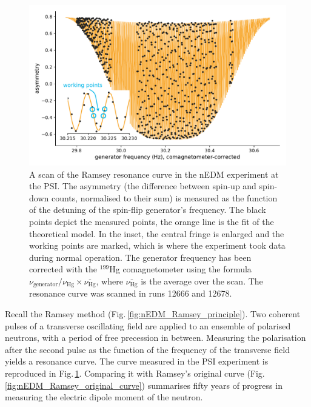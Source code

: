 \begin{figure}
  \centering
  \includegraphics[width=\linewidth]{gfx/nEDMatPSI/ramsey_scan.pdf}
  \caption{A scan of the Ramsey resonance curve in the nEDM experiment at the PSI\@. The asymmetry (the difference between spin-up and spin-down counts, normalised to their sum) is measured as the function of the detuning of the spin-flip generator's frequency. The black points depict the measured points, the orange line is the fit of the theoretical model. In the inset, the central fringe is enlarged and the working points are marked, which is where the experiment took data during normal operation. The generator frequency has been corrected with the $^{199}$Hg comagnetometer using the formula $\nu_\text{generator} / \nu_\text{Hg} \times \overline{\nu_\text{Hg}}$, where $\overline{\nu_\text{Hg}}$ is the average over the scan. The resonance curve was scanned in runs 12666 and 12678.}\label{fig:ramsey_scan}
\end{figure}

Recall the Ramsey method (Fig.\,\ref{fig:nEDM_Ramsey_principle}). Two coherent pulses of a transverse oscillating field are applied to an ensemble of polarised neutrons, with a period of free precession in between. Measuring the polarisation after the second pulse as the function of the frequency of the transverse field yields a resonance curve. The curve measured in the PSI experiment is reproduced in Fig.\,\ref{fig:ramsey_scan}. Comparing it with Ramsey's original curve (Fig.\,\ref{fig:nEDM_Ramsey_original_curve}) summarises fifty years of progress in measuring the electric dipole moment of the neutron.

